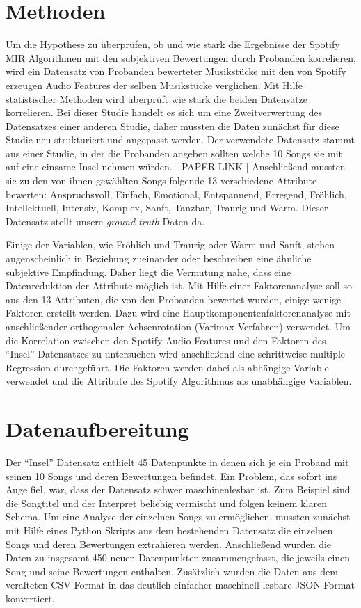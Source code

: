 \section*{Methoden}
\label{sec:Methoden}

Um die Hypothese zu überprüfen, ob und wie stark die Ergebnisse der Spotify MIR Algorithmen mit den subjektiven Bewertungen durch Probanden korrelieren, wird ein Datensatz von Probanden bewerteter Musikstücke mit den von Spotify erzeugen Audio Features der selben Musikstücke verglichen.
Mit Hilfe statistischer Methoden wird überprüft wie stark die beiden Datensätze korrelieren.
Bei dieser Studie handelt es sich um eine Zweitverwertung des Datensatzes einer anderen Studie, daher mussten die Daten zunächst für diese Studie neu strukturiert und angepasst werden.
Der verwendete Datensatz stammt aus einer Studie, in der die Probanden angeben sollten welche 10 Songs sie mit auf eine einsame Insel nehmen würden. [ PAPER LINK ]
Anschließend mussten sie zu den von ihnen gewählten Songs folgende 13 verschiedene Attribute bewerten: Anspruchsvoll, Einfach, Emotional, Entspannend, Erregend, Fröhlich, Intellektuell, Intensiv, Komplex, Sanft, Tanzbar, Traurig und Warm.
Dieser Datensatz stellt unsere \textit{ground truth} Daten da.

Einige der Variablen, wie Fröhlich und Traurig oder Warm und Sanft, stehen augenscheinlich in Beziehung zueinander oder beschreiben eine ähnliche subjektive Empfindung.
Daher liegt die Vermutung nahe, dass eine Datenreduktion der Attribute möglich ist.
Mit Hilfe einer Faktorenanalyse soll so aus den 13 Attributen, die von den Probanden bewertet wurden, einige wenige Faktoren erstellt werden.
Dazu wird eine Hauptkomponentenfaktorenanalyse mit anschließender orthogonaler Achsenrotation (Varimax Verfahren) verwendet.
Um die Korrelation zwischen den Spotify Audio Features und den Faktoren des "`Insel"' Datensatzes zu untersuchen wird anschließend eine schrittweise multiple Regression durchgeführt.
Die Faktoren werden dabei als abhängige Variable verwendet und die Attribute des Spotify Algorithmus als unabhängige Variablen.



\section*{Datenaufbereitung}
\label{sec:Datenaufbereitung}


Der "`Insel"' Datensatz enthielt 45 Datenpunkte in denen sich je ein Proband mit seinen 10 Songs und deren Bewertungen befindet.
Ein Problem, das sofort ins Auge fiel, war, dass der Datensatz schwer maschinenlesbar ist. 
Zum Beispiel sind die Songtitel und der Interpret beliebig vermischt und folgen keinem klaren Schema.
Um eine Analyse der einzelnen Songs zu ermöglichen, mussten zunächst mit Hilfe eines Python Skripts aus dem bestehenden Datensatz die einzelnen Songs und deren Bewertungen extrahieren werden.
Anschließend wurden die Daten zu insgesamt 450 neuen Datenpunkten zusammengefasst, die jeweils einen Song und seine Bewertungen enthalten.
Zusätzlich wurden die Daten aus dem veralteten CSV Format in das deutlich einfacher maschinell lesbare JSON Format konvertiert.

